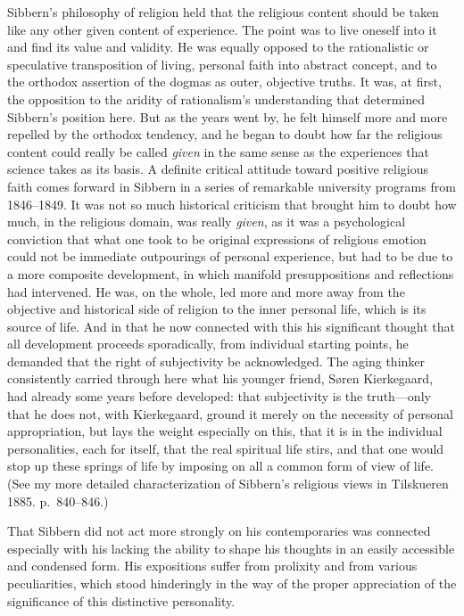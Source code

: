 \documentclass[12pt,a4paper]{book}
\newcommand{\opage}[1]{\marginnote{\footnotesize\textit{[#1]}}}
\begin{document}
Sibbern's philosophy of religion held that the religious content should be
taken like any other given content of experience. The point was to live
oneself into it and find its value and validity. He was equally opposed to
the rationalistic or speculative transposition of living, personal faith
into abstract concept, and to the orthodox assertion of the dogmas as
outer, objective truths. It was, at first, the opposition to the aridity of
rationalism's understanding that determined Sibbern's position here. But as
the years went by, he felt himself more
\opage{23}and more repelled by the orthodox tendency, and he began to doubt how
far the religious content could really be called \textit{given} in the
same sense as the experiences that science takes as its basis. A
definite critical attitude toward positive religious faith comes forward
in Sibbern in a series of remarkable university programs from 1846--1849.
It was not so much historical criticism that brought him to doubt how
much, in the religious domain, was really \textit{given}, as it was a
psychological conviction that what one took to be original expressions of
religious emotion could not be immediate outpourings of personal
experience, but had to be due to a more composite development, in which
manifold presuppositions and reflections had intervened. He was, on the
whole, led more and more away from the objective and historical side of
religion to the inner personal life, which is its source of life. And in
that he now connected with this his significant thought that all
development proceeds sporadically, from individual starting points, he
demanded that the right of subjectivity be acknowledged. The aging
thinker consistently carried through here what his younger friend, Søren
Kierkegaard, had already some years before developed: that subjectivity
is the truth---only that he does not, with Kierkegaard, ground it merely
on the necessity of personal appropriation, but lays the weight
especially on this, that it is in the individual personalities, each for
itself, that the real spiritual life stirs, and that one would stop up
these springs of life by imposing on all a common form of view of life.
(See my more detailed characterization of Sibbern's religious views in
Tilskueren 1885. p.~840--846.)

That Sibbern did not act more strongly on his contemporaries was connected
especially with his lacking the ability to
\opage{24}shape his thoughts in an easily accessible and condensed form. His
expositions suffer from prolixity and from various peculiarities, which
stood hinderingly in the way of the proper appreciation of the
significance of this distinctive personality.
\end{document}
